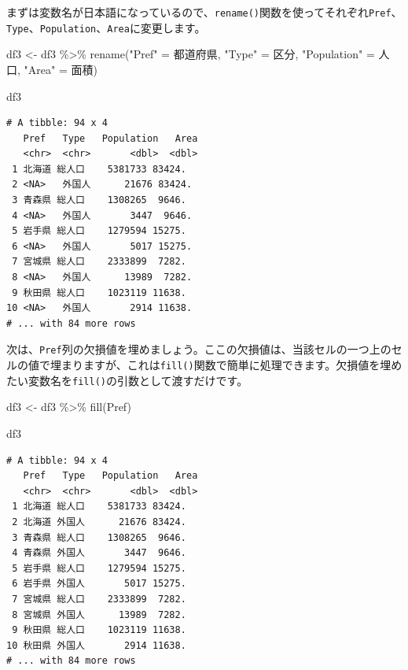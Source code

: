 \documentclass[
  a4paper,
  pandoc,
  ja=standard,
  jafont=haranoaji]{bxjsbook}
\newenvironment{Shaded}{\begin{snugshade}}{\end{snugshade}}
\newcommand{\FunctionTok}[1]{\textcolor[rgb]{0.28,0.35,0.67}{#1}}
\newcommand{\NormalTok}[1]{\textcolor[rgb]{0.00,0.48,0.65}{#1}}
\newcommand{\OtherTok}[1]{\textcolor[rgb]{0.00,0.48,0.65}{#1}}
\newcommand{\SpecialCharTok}[1]{\textcolor[rgb]{0.37,0.37,0.37}{#1}}
\newcommand{\StringTok}[1]{\textcolor[rgb]{0.13,0.47,0.30}{#1}}
\begin{document}
まずは変数名が日本語になっているので、\texttt{rename()}関数を使ってそれぞれ\texttt{Pref}、\texttt{Type}、\texttt{Population}、\texttt{Area}に変更します。

\begin{Shaded}
\begin{Highlighting}[numbers=left,,]
\NormalTok{df3 }\OtherTok{\textless{}{-}}\NormalTok{ df3 }\SpecialCharTok{\%\textgreater{}\%}
  \FunctionTok{rename}\NormalTok{(}\StringTok{"Pref"} \OtherTok{=}\NormalTok{ 都道府県, }\StringTok{"Type"} \OtherTok{=}\NormalTok{ 区分, }\StringTok{"Population"} \OtherTok{=}\NormalTok{ 人口, }\StringTok{"Area"} \OtherTok{=}\NormalTok{ 面積)}

\NormalTok{df3}
\end{Highlighting}
\end{Shaded}

\begin{verbatim}
# A tibble: 94 x 4
   Pref   Type   Population   Area
   <chr>  <chr>       <dbl>  <dbl>
 1 北海道 総人口    5381733 83424.
 2 <NA>   外国人      21676 83424.
 3 青森県 総人口    1308265  9646.
 4 <NA>   外国人       3447  9646.
 5 岩手県 総人口    1279594 15275.
 6 <NA>   外国人       5017 15275.
 7 宮城県 総人口    2333899  7282.
 8 <NA>   外国人      13989  7282.
 9 秋田県 総人口    1023119 11638.
10 <NA>   外国人       2914 11638.
# ... with 84 more rows
\end{verbatim}

次は、\texttt{Pref}列の欠損値を埋めましょう。ここの欠損値は、当該セルの一つ上のセルの値で埋まりますが、これは\texttt{fill()}関数で簡単に処理できます。欠損値を埋めたい変数名を\texttt{fill()}の引数として渡すだけです。

\begin{Shaded}
\begin{Highlighting}[numbers=left,,]
\NormalTok{df3 }\OtherTok{\textless{}{-}}\NormalTok{ df3 }\SpecialCharTok{\%\textgreater{}\%}
  \FunctionTok{fill}\NormalTok{(Pref)}

\NormalTok{df3}
\end{Highlighting}
\end{Shaded}

\begin{verbatim}
# A tibble: 94 x 4
   Pref   Type   Population   Area
   <chr>  <chr>       <dbl>  <dbl>
 1 北海道 総人口    5381733 83424.
 2 北海道 外国人      21676 83424.
 3 青森県 総人口    1308265  9646.
 4 青森県 外国人       3447  9646.
 5 岩手県 総人口    1279594 15275.
 6 岩手県 外国人       5017 15275.
 7 宮城県 総人口    2333899  7282.
 8 宮城県 外国人      13989  7282.
 9 秋田県 総人口    1023119 11638.
10 秋田県 外国人       2914 11638.
# ... with 84 more rows
\end{verbatim}
\end{document}
